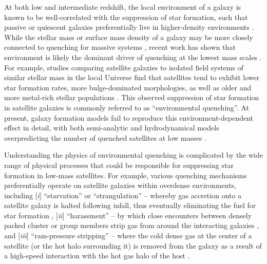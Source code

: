 At both low and intermediate redshift, the local environment of a
galaxy is known to be well-correlated with the suppression of star
formation, such that passive or quiescent galaxies preferentially live
in higher-density environments \citep{balogh04, kauffmann04, blanton05,
  cooper06, cooper07, cooper10b}.
%
While the stellar mass or surface mass density of a galaxy may be more
closely connected to quenching for massive systems \citep{peng10,
  cheung12, woo13}, recent work has shown that environment is likely
the dominant driver of quenching at the lowest mass scales
\citep[$\mstar < 10^9~\msun$,][]{geha12}.  For example, studies
comparing satellite galaxies to isolated field systems of similar
stellar mass in the local Universe find that satellites tend to
exhibit lower star formation rates, more bulge-dominated morphologies,
as well as older and more metal-rich stellar populations
\citep{baldry06, vdb08, cooper10a, pasquali10, tollerud11,phillips14}. This
observed suppression of star formation in satellite galaxies is
commonly referred to as ``environmental quenching''.
%
At present, galaxy formation models fail to reproduce this
environment-dependent effect in detail, with both semi-analytic and
hydrodynamical models overpredicting the number of quenched satellites
at low masses \citep{kimm09, weinmann11, weinmann12, hirschmann14,
  wang14}.


Understanding the physics of environmental quenching is complicated by
the wide range of physical processes that could be responsible for
suppressing star formation in low-mass satellites. For example,
various quenching mechanisms preferentially operate on satellite
galaxies within overdense environments, including [\emph{i}]
``starvation'' or ``strangulation'' -- whereby gas accretion onto a
satellite galaxy is halted following infall, thus eventually
eliminating the fuel for star formation \citep{larson80, kawata08},
[\emph{ii}] ``harassment'' -- by which close encounters between
densely packed cluster or group members strip gas from around the
interacting galaxies \citep{moore96}, and [\emph{iii}] ``ram-pressure
stripping'' -- where the cold dense gas at the center of a satellite
(or the hot halo surrounding it) is %
removed from the galaxy as a result of a high-speed interaction with
the hot gas halo of the host \citep{gunn72, bekki09}.
%

